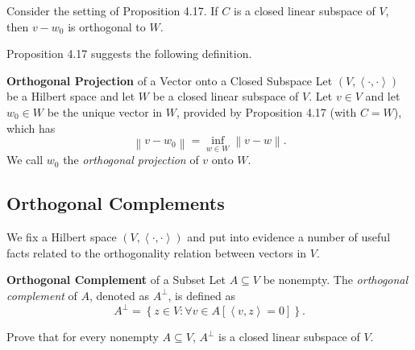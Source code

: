 \documentclass[pmath450]{subfiles}
\begin{document}
    \begin{prop}{}
        Consider the setting of Proposition 4.17. If $C$ is a closed linear subspace of $V$, then $v-w_0$ is orthogonal to $W$.
    \end{prop}

    \rruleline

    \np Proposition 4.17 suggests the following definition.

    \begin{definition}{\textbf{Orthogonal Projection} of a Vector onto a Closed Subspace}
        Let $\left( V,\left\langle \cdot, \cdot\right\rangle \right)$ be a Hilbert space and let $W$ be a closed linear subspace of $V$. Let $v\in V$ and let $w_0\in W$ be the unique vector in $W$, provided by Proposition 4.17 (with $C=W$), which has
        \begin{equation*}
            \left\lVert v-w_0\right\rVert = \inf_{w\in W}\left\lVert v-w\right\rVert.
        \end{equation*}
        We call $w_0$ the \emph{orthogonal projection} of $v$ onto $W$.
    \end{definition}

    \subsection{Orthogonal Complements}

    We fix a Hilbert space $\left( V,\left\langle \cdot, \cdot\right\rangle \right)$ and put into evidence a number of useful facts related to the orthogonality relation between vectors in $V$.
    
    \begin{definition}{\textbf{Orthogonal Complement} of a Subset}
        Let $A\subseteq V$ be nonempty. The \emph{orthogonal complement} of $A$, denoted as $A^{\perp}$, is defined as
        \begin{equation*}
            A^{\perp} = \left\lbrace z\in V: \forall v\in A\left[ \left\langle v, z\right\rangle=0 \right] \right\rbrace.
        \end{equation*}
    \end{definition}

    \begin{exercise}{}
        Prove that for every nonempty $A\subseteq V$, $A^{\perp}$ is a closed linear subspace of $V$.
    \end{exercise}
\end{document}
